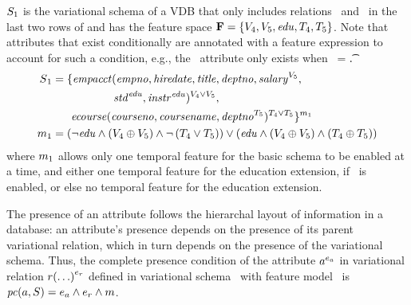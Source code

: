\begin{example}
\label{eg:vsch}
$\vSch_1$ is the variational schema of a VDB that only includes relations \empacct\ and \ecourse\ in the last two rows
of  and has the
feature space 
\ensuremath{\fSet = \setDef{ \vFour, \vFive, \edu, \tFour, \tFive}}.
Note that attributes that exist conditionally are annotated with a feature expression
to account for such a condition, e.g., the \salary\ attribute only exists when \vFive\ = \t.
%
\begin{align*}
\vSch_1 &=
\{ \empacct ( \empno, \hiredate, \titleatt, \deptno, \annot [\vFive] \salary, \\
&\hspace{55pt} \annot [\edu] \isstudent,
\annot [\edu] \isteacher )^{\vFour \vee \vFive},\\
%
&\hspace{17pt} \ecourse ( \cno, \cname, \annot [\tFive] \deptno )^{\tFour \vee \tFive} \}^{\fModel_1}\\
\fModel_1 &= 
\paran {\neg \edu \wedge \paran {\vFour \oplus \vFive} \wedge \neg \paran {\tFour \vee \tFive}
 }
\vee
\paran {\edu \wedge \paran {\vFour \oplus \vFive}
\wedge
\paran {\tFour \oplus \tFive}}
\end{align*}
where \ensuremath{\fModel_1} allows only one temporal feature for the basic
schema to be enabled at a time, and either one temporal feature for the education
extension, if \edu\ is enabled, or else no temporal feature for the education
extension.
\end{example}



The presence of an attribute follows the hierarchal layout of information in a database:
an attribute's presence depends on the presence of its parent variational relation, which in turn 
depends on the presence of the variational schema. 
%
Thus, the complete presence condition of the attribute
$\annot[\dimMeta_\vAtt]{\vAtt}$ in variational relation
$\vRel\annot[\dimMeta_\vRel]{(\ldots)}$ defined in variational schema \vSch\ with feature
model \fModel\ is
$\getPCfrom{\vAtt}{\vSch}=\dimMeta_\vAtt\wedge\dimMeta_\vRel\wedge\fModel$.

